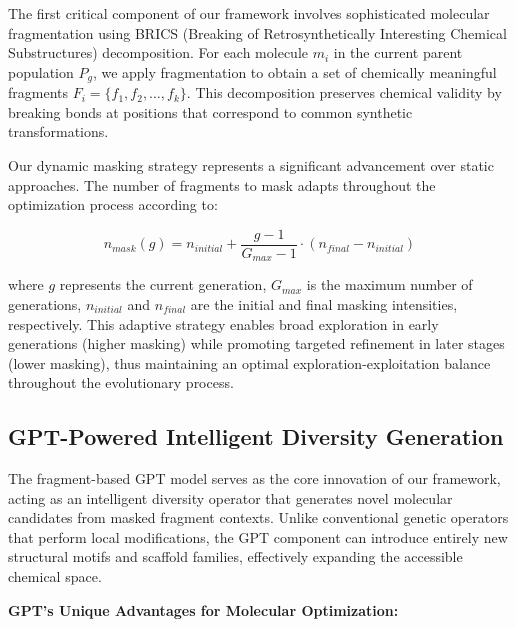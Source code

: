 \documentclass[lettersize,journal]{IEEEtran}
\begin{document}
The first critical component of our framework involves sophisticated molecular fragmentation using BRICS (Breaking of Retrosynthetically Interesting Chemical Substructures) decomposition. For each molecule $m_i$ in the current parent population $P_g$, we apply fragmentation to obtain a set of chemically meaningful fragments $F_i = \{f_1, f_2, \ldots, f_k\}$. This decomposition preserves chemical validity by breaking bonds at positions that correspond to common synthetic transformations.

Our dynamic masking strategy represents a significant advancement over static approaches. The number of fragments to mask adapts throughout the optimization process according to:

\begin{equation}
n_{mask}(g) = n_{initial} + \frac{g-1}{G_{max}-1} \cdot (n_{final} - n_{initial})
\end{equation}

where $g$ represents the current generation, $G_{max}$ is the maximum number of generations, $n_{initial}$ and $n_{final}$ are the initial and final masking intensities, respectively. This adaptive strategy enables broad exploration in early generations (higher masking) while promoting targeted refinement in later stages (lower masking), thus maintaining an optimal exploration-exploitation balance throughout the evolutionary process.

\subsection{GPT-Powered Intelligent Diversity Generation}

The fragment-based GPT model serves as the core innovation of our framework, acting as an intelligent diversity operator that generates novel molecular candidates from masked fragment contexts. Unlike conventional genetic operators that perform local modifications, the GPT component can introduce entirely new structural motifs and scaffold families, effectively expanding the accessible chemical space.

\noindent \textbf{GPT's Unique Advantages for Molecular Optimization:}
\end{document}
